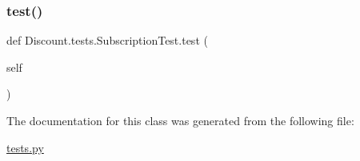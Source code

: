\subsubsection{\texorpdfstring{test()}{test()}}
{\footnotesize\ttfamily def Discount.\+tests.\+Subscription\+Test.\+test (\begin{DoxyParamCaption}\item[{}]{self }\end{DoxyParamCaption})}



The documentation for this class was generated from the following file\+:\begin{DoxyCompactItemize}
\item 
\hyperlink{tests_8py}{tests.\+py}\end{DoxyCompactItemize}
